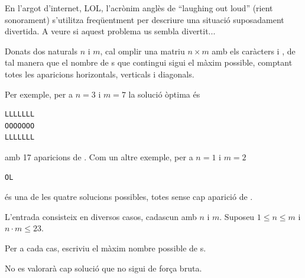 

\Statement

En l'argot d'internet,
LOL, l'acrònim anglès de ``laughing out loud'' (rient sonorament)
s'utilitza freqüentment per descriure una situació suposadament divertida.
A veure si aquest problema us sembla divertit...

\medskip

Donats dos naturals $n$ i $m$,
cal omplir una matriu $n \times m$
amb els caràcters  i ,
de tal manera que el nombre de s que contingui sigui el màxim possible,
comptant totes les aparicions horizontals, verticals i diagonals.

\medskip

Per exemple, per a $n = 3$ i $m = 7$
la solució òptima és
\begin{verbatim}
LLLLLLL
OOOOOOO
LLLLLLL
\end{verbatim}
amb 17 aparicions de .
Com un altre exemple, per a $n = 1$ i $m = 2$
\begin{verbatim}
OL
\end{verbatim}
és una de les quatre solucions possibles,
totes sense cap aparició de .


\Input

L'entrada consisteix en diversos casos,
cadascun amb $n$ i $m$.
Suposeu $1 \le n \le m$ i $n \cdot m \le 23$.


\Output

Per a cada cas,
escriviu el màxim nombre possible de s.


\Observation

No es valorarà cap solució que no sigui de força bruta.


\Sample
